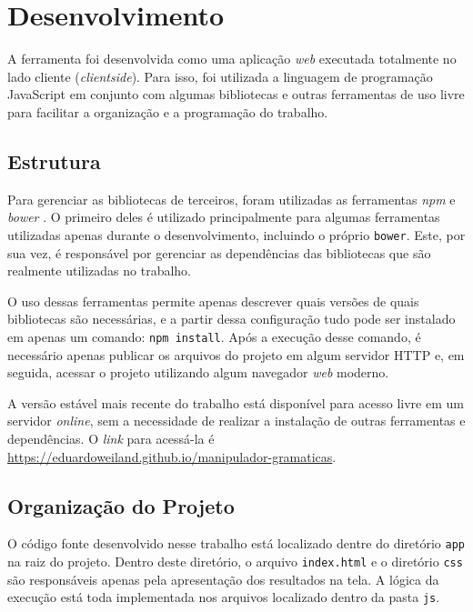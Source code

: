 \documentclass[12pt]{article}
\begin{document}

\section{Desenvolvimento}

A ferramenta foi desenvolvida como uma aplicação \textit{web} executada totalmente no lado cliente (\textit{clientside}).
Para isso, foi utilizada a linguagem de programação JavaScript em conjunto com algumas bibliotecas e outras ferramentas
de uso livre para facilitar a organização e a programação do trabalho.

\subsection{Estrutura}

Para gerenciar as bibliotecas de terceiros, foram utilizadas as ferramentas \textit{npm} \cite{npm} e \textit{bower}
\cite{bower}. O primeiro deles é utilizado principalmente para algumas ferramentas utilizadas apenas durante o
desenvolvimento, incluindo o próprio \texttt{bower}. Este, por sua vez, é responsável por gerenciar as dependências
das bibliotecas que são realmente utilizadas no trabalho.

O uso dessas ferramentas permite apenas descrever quais versões de quais bibliotecas são necessárias, e a partir dessa
configuração tudo pode ser instalado em apenas um comando: \texttt{npm install}. Após a execução desse comando, é
necessário apenas publicar os arquivos do projeto em algum servidor HTTP e, em seguida, acessar o projeto utilizando
algum navegador \textit{web} moderno.

A versão estável mais recente do trabalho está disponível para acesso livre em um servidor \textit{online}, sem a
necessidade de realizar a instalação de outras ferramentas e dependências. O \textit{link} para acessá-la é
\href{https://eduardoweiland.github.io/manipulador-gramaticas}{https://eduardoweiland.github.io/manipulador-gramaticas}.

\subsection{Organização do Projeto}

O código fonte desenvolvido nesse trabalho está localizado dentre do diretório \texttt{app} na raiz do projeto. Dentro
deste diretório, o arquivo \texttt{index.html} e o diretório \texttt{css} são responsáveis apenas pela apresentação dos
resultados na tela. A lógica da execução está toda implementada nos arquivos localizado dentro da pasta \texttt{js}.
\end{document}
